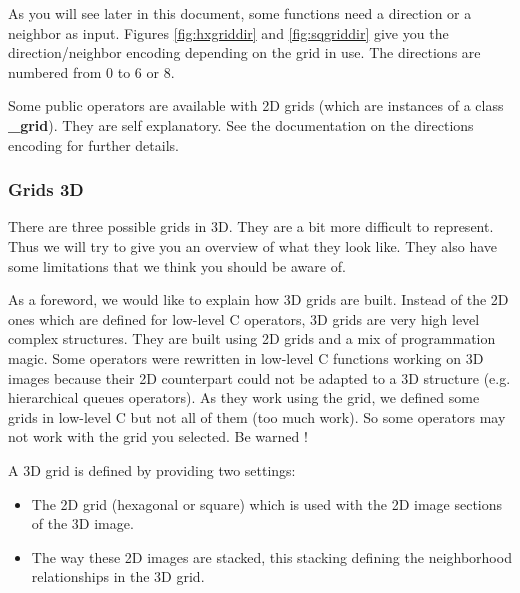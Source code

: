 \documentclass[a4paper,10pt,oneside]{article}
\begin{document}
As you will see later in this document, some functions need a direction or a 
neighbor as input. Figures \ref{fig:hxgriddir} and \ref{fig:sqgriddir} give you
the direction/neighbor encoding depending on the grid in use. The directions
are numbered from 0 to 6 or 8.

Some public operators are available with 2D grids (which are instances of a class \textbf{\_grid}). They are self
explanatory. See the documentation on the directions encoding for further details.

\subsubsection{Grids 3D}

There are three possible grids in 3D. They are a bit more
difficult to represent. Thus we will try to give you an overview
of what they look like. They also have some limitations that we think you
should be aware of.

As a foreword, we would like to explain how 3D grids are built.
Instead of the 2D ones which are defined for low-level C operators, 3D
grids are very high level complex structures. They are built using 2D grids and
a mix of programmation magic. Some operators were rewritten in low-level C
functions working on 3D images because their 2D counterpart could not be adapted
to a 3D structure (e.g. hierarchical queues operators). As they work using the
grid, we defined some grids in low-level C but not all of them (too much work).
So some operators may not work with the grid you selected. Be warned !

A 3D grid is defined by providing two settings:

\begin{itemize}
\item The 2D grid (hexagonal or square) which is used with the 2D image sections of the 3D image.
\item The way these 2D images are stacked, this stacking defining the neighborhood relationships in the 3D grid.
\end{itemize}

\end{document}
